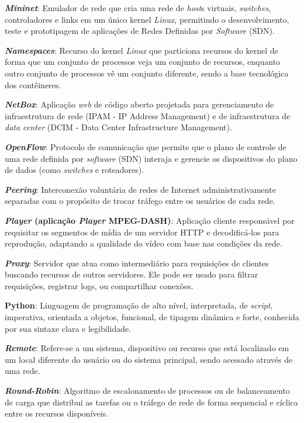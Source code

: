 {\textbf{\textit{Mininet}}: Emulador de rede que cria uma rede de \textit{host}s virtuais, \textit{switches}, controladores e links em um único kernel \textit{Linux}, permitindo o desenvolvimento, teste e prototipagem de aplicações de Redes Definidas por \textit{Software} (SDN).

\textbf{\textit{Namespaces}}: Recurso do kernel \textit{Linux} que particiona recursos do kernel de forma que um conjunto de processos veja um conjunto de recursos, enquanto outro conjunto de processos vê um conjunto diferente, sendo a base tecnológica dos contêineres.

\textbf{\textit{NetBox}}: Aplicação \textit{web} de código aberto projetada para gerenciamento de infraestrutura de rede (IPAM - IP Address Management) e de infraestrutura de \textit{data center} (DCIM - Data Center Infrastructure Management).

\textbf{\textit{OpenFlow}}: Protocolo de comunicação que permite que o plano de controle de uma rede definida por \textit{software} (SDN) interaja e gerencie os dispositivos do plano de dados (como \textit{switches} e roteadores).

\textbf{\textit{Peering}}: Interconexão voluntária de redes de Internet administrativamente separadas com o propósito de trocar tráfego entre os usuários de cada rede.

\textbf{\textit{Player} (aplicação \textit{Player} MPEG-DASH)}: Aplicação cliente responsável por requisitar os segmentos de mídia de um servidor HTTP e decodificá-los para reprodução, adaptando a qualidade do vídeo com base nas condições da rede.

\textbf{\textit{Proxy}}: Servidor que atua como intermediário para requisições de clientes buscando recursos de outros servidores. Ele pode ser usado para filtrar requisições, registrar logs, ou compartilhar conexões.

\textbf{Python}: Linguagem de programação de alto nível, interpretada, de \textit{script}, imperativa, orientada a objetos, funcional, de tipagem dinâmica e forte, conhecida por sua sintaxe clara e legibilidade.

\textbf{\textit{Remote}}: Refere-se a um sistema, dispositivo ou recurso que está localizado em um local diferente do usuário ou do sistema principal, sendo acessado através de uma rede.

\textbf{\textit{Round-Robin}}: Algoritmo de escalonamento de processos ou de balanceamento de carga que distribui as tarefas ou o tráfego de rede de forma sequencial e cíclica entre os recursos disponíveis.

}
